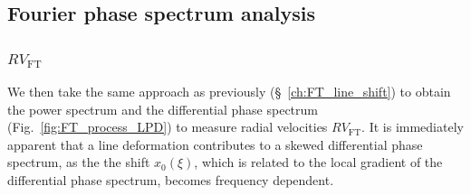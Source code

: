 \subsection{Fourier phase spectrum analysis}

\subsubsection{$RV_\text{FT}$}
We then take the same approach as previously (\S~\ref{ch:FT_line_shift}) to obtain the power spectrum and the differential phase spectrum (Fig.~\ref{fig:FT_process_LPD}) to measure radial velocities $RV_\text{FT}$. It is immediately apparent that a line deformation contributes to a skewed differential phase spectrum, as the the shift $x_0(\xi)$, which is related to the local gradient of the differential phase spectrum, becomes frequency dependent. 

